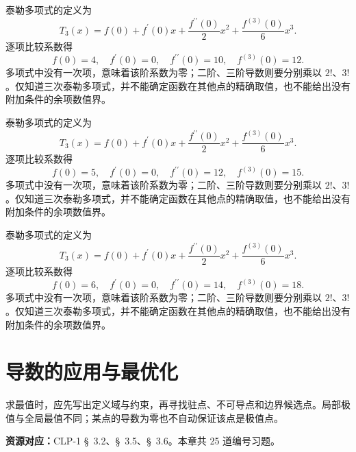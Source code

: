 \documentclass[12pt,fontset=fandol]{ctexart}
\begin{document}
\begin{solve}\label{ans:c10q23}
泰勒多项式的定义为
\[
T_3(x)=f(0)+f^{\prime}(0)x+\frac{f^{\prime\prime}(0)}2x^2+\frac{f^{(3)}(0)}6x^3.
\]
逐项比较系数得
\[
f(0)=4,\quad f^{\prime}(0)=0,\quad f^{\prime\prime}(0)=10,\quad f^{(3)}(0)=12.
\]
多项式中没有一次项，意味着该阶系数为零；二阶、三阶导数则要分别乘以 $2!$、$3!$。仅知道三次泰勒多项式，并不能确定函数在其他点的精确取值，也不能给出没有附加条件的余项数值界。
\end{solve}

\begin{solve}\label{ans:c10q24}
泰勒多项式的定义为
\[
T_3(x)=f(0)+f^{\prime}(0)x+\frac{f^{\prime\prime}(0)}2x^2+\frac{f^{(3)}(0)}6x^3.
\]
逐项比较系数得
\[
f(0)=5,\quad f^{\prime}(0)=0,\quad f^{\prime\prime}(0)=12,\quad f^{(3)}(0)=15.
\]
多项式中没有一次项，意味着该阶系数为零；二阶、三阶导数则要分别乘以 $2!$、$3!$。仅知道三次泰勒多项式，并不能确定函数在其他点的精确取值，也不能给出没有附加条件的余项数值界。
\end{solve}

\begin{solve}\label{ans:c10q25}
泰勒多项式的定义为
\[
T_3(x)=f(0)+f^{\prime}(0)x+\frac{f^{\prime\prime}(0)}2x^2+\frac{f^{(3)}(0)}6x^3.
\]
逐项比较系数得
\[
f(0)=6,\quad f^{\prime}(0)=0,\quad f^{\prime\prime}(0)=14,\quad f^{(3)}(0)=18.
\]
多项式中没有一次项，意味着该阶系数为零；二阶、三阶导数则要分别乘以 $2!$、$3!$。仅知道三次泰勒多项式，并不能确定函数在其他点的精确取值，也不能给出没有附加条件的余项数值界。
\end{solve}

\clearpage
\section{导数的应用与最优化}\label{sec:ch11}
求最值时，应先写出定义域与约束，再寻找驻点、不可导点和边界候选点。局部极值与全局最值不同；某点的导数为零也不自动保证该点是极值点。

\textbf{资源对应：}CLP-1 \S~3.2、\S~3.5、\S~3.6。本章共 25 道编号习题。
\end{document}
